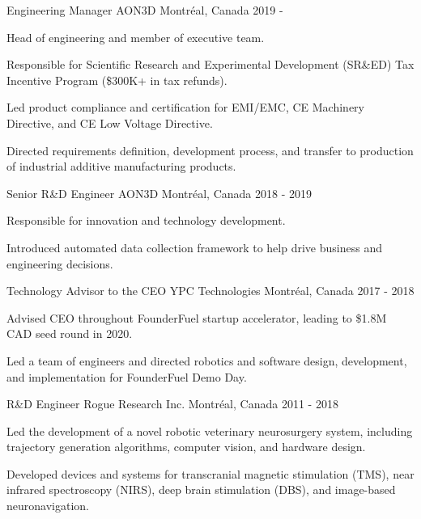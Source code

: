 \begin{cventries}

\cventry
{Engineering Manager}
{AON3D}
{Montréal, Canada}
{2019 - }
{
\begin{cvitems}
\item{Head of engineering and member of executive team.}
\item{Responsible for Scientific Research and Experimental Development (SR\&ED) Tax Incentive Program (\$300K+ in tax refunds).}
\item{Led product compliance and certification for EMI/EMC, CE Machinery Directive, and CE Low Voltage Directive.}
\item{Directed requirements definition, development process, and transfer to production of industrial additive manufacturing products.}
\end{cvitems}
}

\cventry
{Senior R\&D Engineer}
{AON3D}
{Montréal, Canada}
{2018 - 2019}
{
\begin{cvitems}
\item{Responsible for innovation and technology development.}
\item{Introduced automated data collection framework to help drive business and engineering decisions.}
\end{cvitems}
}

\cventry
{Technology Advisor to the CEO}
{YPC Technologies}
{Montréal, Canada}
{2017 - 2018}
{
\begin{cvitems}
\item{Advised CEO throughout FounderFuel startup accelerator, leading to \$1.8M CAD seed round in 2020.}
\item{Led a team of engineers and directed robotics and software design, development, and implementation for FounderFuel Demo Day.}
\end{cvitems}
}

\cventry
{R\&D Engineer}
{Rogue Research Inc.}
{Montréal, Canada}
{2011 - 2018}
{
\begin{cvitems}
\item{Led the development of a novel robotic veterinary neurosurgery system, including trajectory generation algorithms, computer vision, and hardware design.}
\item{Developed devices and systems for transcranial magnetic stimulation (TMS), near infrared spectroscopy (NIRS), deep brain stimulation (DBS), and image-based neuronavigation.}
\end{cvitems}
}

\end{cventries}
